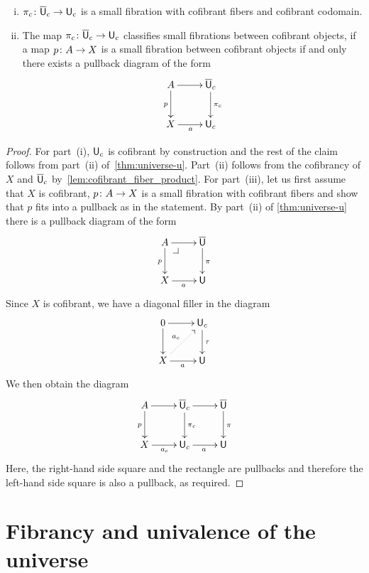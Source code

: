 \documentclass[reqno,10pt,a4paper,oneside,draft]{amsart}
\begin{document}
\begin{theorem} \label{thm:universe-uc} 
\hfill 
\begin{enumerate}[(i)] 
\item $\pi_c \colon \overline{\mathsf{U}}_c \to \mathsf{U}_c$ is a small fibration with cofibrant fibers and cofibrant codomain. 
\item The map $\pi_c \colon \overline{\mathsf{U}}_c \to \mathsf{U}_c$ classifies small fibrations between cofibrant
objects, \ie if a map $p \colon A \to X$ is a small fibration between cofibrant objects
if and only there exists a pullback diagram of the form
\[
\xymatrix{
A \ar[r] \ar[d]_p & \UU_c \ar[d]^{\pi_c} \\
X \ar[r]_a & \U_c }
\]
\end{enumerate}
\end{theorem}

\begin{proof} For part~(i), $\mathsf{U}_c$ is cofibrant by construction and the rest of the claim follows from part~(ii) of~\cref{thm:universe-u}. Part~(ii) follows from the cofibrancy of $X$ and $\overline{\mathsf{U}}_c$ by~\cref{lem:cofibrant_fiber_product}.
For part~(iii),  let us first assume that  $X$ is cofibrant, $p \colon A \to X$ is a small fibration with cofibrant fibers
and show that $p$ fits into a pullback as in the statement.  By part~(ii) of \cref{thm:universe-u} there is a pullback diagram of the form 
\[
\xymatrix{
A \ar[r] \ar[d]_p \drpullback & \UU \ar[d]^{\pi} \\
X \ar[r]_a & \U }
\]
Since $X$ is cofibrant, we have a diagonal filler in the diagram
\[
\xymatrix{
0 \ar[r] \ar[d] & \U_c \ar[d]^{\tau} \\
X \ar[r]_a \ar@{.>}[ur]^{a_c} & \U }
\]
 We then obtain the diagram
\[
\xymatrix{
A \ar[r] \ar[d]_p &  \UU_c \ar[r]  \ar[d]^{\pi_c}  & \UU \ar[d]^{\pi} \\
X \ar[r]_{a_c} & \U_c \ar[r]_{a} &  \U }
\]
Here, the right-hand side square and the rectangle are pullbacks and therefore the left-hand
side square is also a pullback, as required. 
\end{proof} 

\section{Fibrancy and univalence of the universe}
\label{sec:fibrancy-and-univalence}
\end{document}
